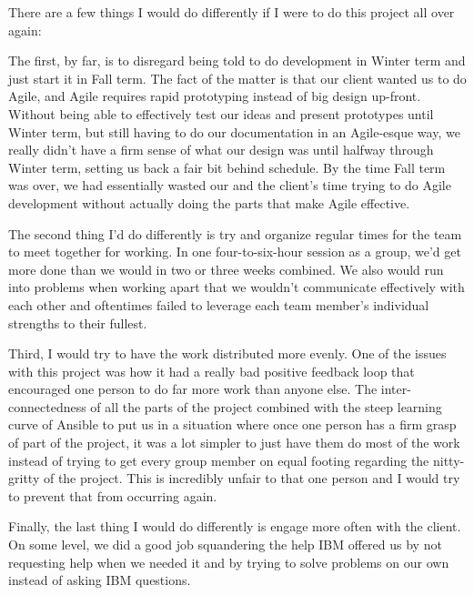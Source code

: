 \documentclass[10pt,letterpaper,onecolumn,draftclsnofoot]{IEEEtran}
\begin{document}
There are a few things I would do differently if I were to do this project all over again:

The first, by far, is to disregard being told to do development in Winter term and just start it in Fall term. The fact
of the matter is that our client wanted us to do Agile, and Agile requires rapid prototyping instead of big design
up-front. Without being able to effectively test our ideas and present prototypes until Winter term, but still having
to do our documentation in an Agile-esque way, we really didn't have a firm sense of what our design was until halfway
through Winter term, setting us back a fair bit behind schedule. By the time Fall term was over, we had essentially
wasted our and the client's time trying to do Agile development without actually doing the parts that make Agile
effective.

The second thing I'd do differently is try and organize regular times for the team to meet together for working. In one
four-to-six-hour session as a group, we'd get more done than we would in two or three weeks combined. We also would run
into problems when working apart that we wouldn't communicate effectively with each other and oftentimes failed to
leverage each team member's individual strengths to their fullest.

Third, I would try to have the work distributed more evenly. One of the issues with this project was how it had a really
bad positive feedback loop that encouraged one person to do far more work than anyone else. The inter-connectedness of
all the parts of the project combined with the steep learning curve of Ansible to put us in a situation where once one
person has a firm grasp of part of the project, it was a lot simpler to just have them do most of the work instead of
trying to get every group member on equal footing regarding the nitty-gritty of the project. This is incredibly unfair
to that one person and I would try to prevent that from occurring again.

Finally, the last thing I would do differently is engage more often with the client. On some level, we did a good job
squandering the help IBM offered us by not requesting help when we needed it and by trying to solve problems on our own
instead of asking IBM questions.
\end{document}
